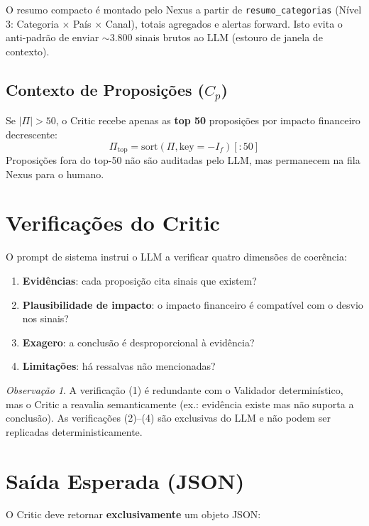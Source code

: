 \documentclass[a4paper, 12pt]{report}
\theoremstyle{definition}
\theoremstyle{remark}
\newtheorem{observacao}{Observa\c{c}\~ao}[chapter]
\begin{document}
O resumo compacto \'e montado pelo Nexus a partir de
\texttt{resumo\_categorias} (N\'ivel 3: Categoria $\times$ Pa\'is $\times$ Canal),
totais agregados e alertas forward. Isto evita o anti-padr\~ao de enviar
$\sim$3.800 sinais brutos ao LLM (estouro de janela de contexto).

\subsection{Contexto de Proposi\c{c}\~oes ($C_p$)}

Se $|\Pi| > 50$, o Critic recebe apenas as \textbf{top 50} proposi\c{c}\~oes
por impacto financeiro decrescente:
\[
  \Pi_{\text{top}} = \text{sort}(\Pi, \text{key}=-I_f)[:50]
\]
Proposi\c{c}\~oes fora do top-50 n\~ao s\~ao auditadas pelo LLM, mas
permanecem na fila Nexus para o humano.


\section{Verifica\c{c}\~oes do Critic}

O prompt de sistema instrui o LLM a verificar quatro dimens\~oes
de coer\^encia:

\begin{enumerate}
  \item \textbf{Evid\^encias}: cada proposi\c{c}\~ao cita sinais que existem?
  \item \textbf{Plausibilidade de impacto}: o impacto financeiro \'e
    compat\'ivel com o desvio nos sinais?
  \item \textbf{Exagero}: a conclus\~ao \'e desproporcional \`a evid\^encia?
  \item \textbf{Limita\c{c}\~oes}: h\'a ressalvas n\~ao mencionadas?
\end{enumerate}

\begin{observacao}
  A verifica\c{c}\~ao (1) \'e redundante com o Validador determin\'istico,
  mas o Critic a reavalia semanticamente (ex.: evid\^encia existe mas
  n\~ao suporta a conclus\~ao). As verifica\c{c}\~oes (2)--(4) s\~ao
  exclusivas do LLM e n\~ao podem ser replicadas deterministicamente.
\end{observacao}


\section{Sa\'ida Esperada (JSON)}

O Critic deve retornar \textbf{exclusivamente} um objeto JSON:
\end{document}

